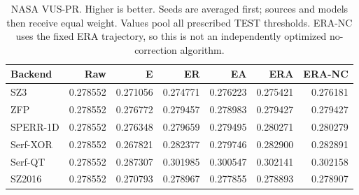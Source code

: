 \begin{table}[t]
\centering
\small
\setlength{\tabcolsep}{5pt}
\caption{NASA VUS-PR. Higher is better. Seeds are averaged first; sources and models then receive equal weight. Values pool all prescribed TEST thresholds. ERA-NC uses the fixed ERA trajectory, so this is not an independently optimized no-correction algorithm.}
\label{tab:s-ablation-quality-anomaly-VUS-PR}
\begin{tabular}{@{}lrrrrrr@{}}
\toprule
Backend & Raw & E & ER & EA & ERA & ERA-NC \\
\midrule
SZ3 & 0.278552 & 0.271056 & 0.274771 & 0.276223 & 0.275421 & 0.276181 \\
ZFP & 0.278552 & 0.276772 & 0.279457 & 0.278983 & 0.279427 & 0.279427 \\
SPERR-1D & 0.278552 & 0.276348 & 0.279659 & 0.279495 & 0.280271 & 0.280279 \\
Serf-XOR & 0.278552 & 0.267821 & 0.282377 & 0.279746 & 0.282900 & 0.282891 \\
Serf-QT & 0.278552 & 0.287307 & 0.301985 & 0.300547 & 0.302141 & 0.302158 \\
SZ2016 & 0.278552 & 0.270793 & 0.278967 & 0.277855 & 0.278893 & 0.278907 \\
\bottomrule
\end{tabular}
\end{table}

